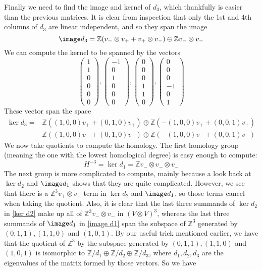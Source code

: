 Finally we need to find the image and kernel of $d_3$, which thankfully is easier than the previous matrices. It is clear from inspection that only the 1st and 4th columns of $d_3$ are linear independent, and so they span the image
\[ \image d_3 = \mathbb Z (v_- \otimes v_+ + v_+ \otimes v_-) \oplus \mathbb Z v_- \otimes v_- \]
We can compute the kernel to be spanned by the vectors
\[
\left( \begin{array}{r} 1\\1\\0\\0\\0\\0 \end{array} \right), 
\left( \begin{array}{r} -1\\0\\1\\0\\0\\0 \end{array} \right), 
\left( \begin{array}{r} 0\\0\\0\\1\\1\\0 \end{array} \right), 
\left( \begin{array}{r} 0\\0\\0\\-1\\0\\1 \end{array} \right)
\]
These vector span the space
\begin{align*}
\ker d_3 =& \mathbb Z \left( (1,0,0) v_+ + (0,1,0) v_+ \right) \oplus \mathbb Z \left( -(1,0,0) v_+ + (0,0,1) v_+ \right) \\
          & \mathbb Z \left( (1,0,0) v_- + (0,1,0) v_- \right) \oplus \mathbb Z \left( -(1,0,0) v_- + (0,0,1) v_- \right)
\end{align*}
We now take quotients to compute the homology. The first homology group (meaning the one with the lowest homological degree) is easy enough to compute:
\[ H^{-3} = \ker d_1 = \mathbb Z v_- \otimes v_- \otimes v_- \]
The next group is more complicated to compute, mainly because a look back at $\ker d_2$ and $\image d_1$ shows that they are quite complicated. However, we see that there is a $\mathbb Z^3 v_+ \otimes v_+$ term in $\ker d_2$ and $\image d_1$, so those terms cancel when taking the quotient. Also, it is clear that the last three summands of $\ker d_2$ in \eqref{ker d2} make up all of $\mathbb Z^3 v_- \otimes v_-$ in $(V \otimes V)^3$, whereas the last three summands of $\image d_1$ in \eqref{image d1} span the subspace of $\mathbb Z^3$ generated by $(0,1,1),(1,1,0)$ and $(1,0,1)$. By our useful trick mentioned earlier, we have that the quotient of $\mathbb Z^3$ by the subspace generated by $(0,1,1),(1,1,0)$ and $(1,0,1)$ is isomorphic to $\mathbb Z/d_1 \oplus \mathbb Z/d_2 \oplus \mathbb Z/d_3$, where $d_1,d_2,d_3$ are the eigenvalues of the matrix formed by those vectors. So we have
